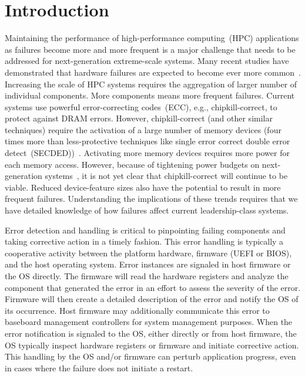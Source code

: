 
\section{Introduction}
\label{sec:intro}

Maintaining the performance of high-performance computing~(HPC) applications as
failures become more and more frequent is a major challenge that needs to be
addressed for next-generation extreme-scale systems.  Many recent studies have
demonstrated that hardware failures are expected to become ever more
common~\cite{Bergman08exascalecomputing}.  Increasing the scale of HPC systems
requires the aggregation of larger number of individual components.  More
components means more frequent failures.  Current systems use powerful
error-correcting codes~(ECC), e.g., chipkill-correct, to protect against DRAM
errors.  However, chipkill-correct (and other similar techniques) require the
activation of a large number of memory devices (four times more than
less-protective techniques like single error correct double error
detect~(SECDED))~\cite{Jian13}.  Activating more memory devices requires more
power for each memory access.  However, because of tightening power budgets on
next-generation systems~\cite{Bergman08exascalecomputing}, it is not yet clear
that chipkill-correct will continue to be viable.  Reduced device-feature sizes
also have the potential to result in more frequent failures.  Understanding the
implications of these trends requires that we have detailed knowledge of how
failures affect current leadership-class systems.

Error detection and handling is critical to pinpointing failing components and
taking corrective action in a timely fashion. This error handling is typically a
cooperative activity between the platform hardware, firmware (UEFI or BIOS), and
the host operating system.  Error instances are signaled in host firmware or
the OS directly. The firmware will read the hardware registers and analyze the
component that generated the error in an effort to assess the severity of the
error. Firmware will then create a detailed description of the error and notify
the OS of its occurrence. Host firmware may additionally communicate this error
to baseboard management controllers for system management purposes.  When the
error notification is signaled to the OS, either directly or from host
firmware, the OS typically inspect hardware registers or firmware and initiate
corrective action.  This handling by the OS and/or firmware can perturb
application progress, even in cases where the failure does not initiate a
restart.

